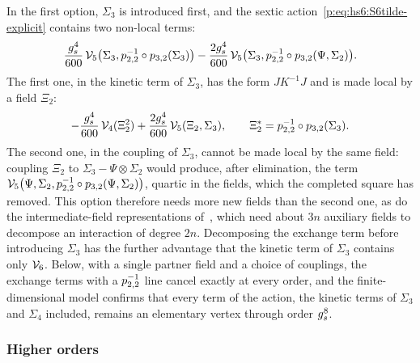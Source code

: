 In the first option, $\Sigma_3$ is introduced first, and the sextic action~\eqref{p:eq:hs6:S6tilde-explicit} contains two non-local terms:
  \begin{equation}
  \frac{g_s^4}{600} \, \mathcal{V}_{5}\big(\Sigma_3, p_{2,2}^{-1} \circ p_{3,2}(\Sigma_3)\big)
    - \frac{2 g_s^4}{600} \, \mathcal{V}_{5}\big(\Sigma_3, p_{2,2}^{-1} \circ p_{3,2}(\Psi, \Sigma_2)\big).
\end{equation}
  The first one, in the kinetic term of $\Sigma_3$, has the form $J K^{-1} J$ and is made local by a field $\Xi_2$:
  \begin{equation}
  \label{p:eq:wsp:local-kinetic}
  - \frac{g_s^4}{600} \, \mathcal{V}_{4}(\Xi_2^2)
    + \frac{2 g_s^4}{600} \, \mathcal{V}_{5}(\Xi_2, \Sigma_3),
  \qquad
  \Xi_2^*
    = p_{2,2}^{-1} \circ p_{3,2}(\Sigma_3).
\end{equation}
  The second one, in the coupling of $\Sigma_3$, cannot be made local by the same field: coupling $\Xi_2$ to $\Sigma_3 - \Psi \otimes \Sigma_2$ would produce, after elimination, the term $\mathcal{V}_{5}\big(\Psi, \Sigma_2, p_{2,2}^{-1} \circ p_{3,2}(\Psi, \Sigma_2)\big)$, quartic in the fields, which the completed square has removed.
This option therefore needs more new fields than the second one, as do the intermediate-field representations of~\cite{Rivasseau:2010:LoopVertexExpansion,Lionni:2018:NoteIntermediateField}, which need about $3 n$ auxiliary fields to decompose an interaction of degree $2 n$.
  Decomposing the exchange term before introducing $\Sigma_3$ has the further advantage that the kinetic term of $\Sigma_3$ contains only $\mathcal{V}_{6}$.
  Below, with a single partner field and a choice of couplings, the exchange terms with a $p_{2,2}^{-1}$ line cancel exactly at every order, and the finite-dimensional model confirms that every term of the action, the kinetic terms of $\Sigma_3$ and $\Sigma_4$ included, remains an elementary vertex through order $g_s^8$.


\subsubsection{Higher orders}

